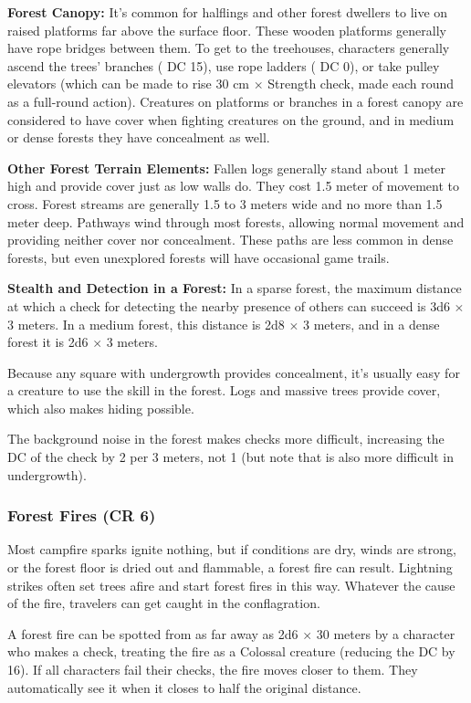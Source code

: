 \textbf{Forest Canopy:} It's common for halflings and other forest dwellers to live on raised platforms far above the surface floor. These wooden platforms generally have rope bridges between them. To get to the treehouses, characters generally ascend the trees' branches ( DC 15), use rope ladders ( DC 0), or take pulley elevators (which can be made to rise 30 cm $\times$ Strength check, made each round as a full-round action). Creatures on platforms or branches in a forest canopy are considered to have cover when fighting creatures on the ground, and in medium or dense forests they have concealment as well.

\textbf{Other Forest Terrain Elements:} Fallen logs generally stand about 1 meter high and provide cover just as low walls do. They cost 1.5 meter of movement to cross. Forest streams are generally 1.5 to 3 meters wide and no more than 1.5 meter deep. Pathways wind through most forests, allowing normal movement and providing neither cover nor concealment. These paths are less common in dense forests, but even unexplored forests will have occasional game trails.

\textbf{Stealth and Detection in a Forest:} In a sparse forest, the maximum distance at which a  check for detecting the nearby presence of others can succeed is 3d6 $\times$ 3 meters. In a medium forest, this distance is 2d8 $\times$ 3 meters, and in a dense forest it is 2d6 $\times$ 3 meters.

Because any square with undergrowth provides concealment, it's usually easy for a creature to use the  skill in the forest. Logs and massive trees provide cover, which also makes hiding possible.

The background noise in the forest makes  checks more difficult, increasing the DC of the check by 2 per 3 meters, not 1 (but note that  is also more difficult in undergrowth).

\subsubsection{Forest Fires (CR 6)}
Most campfire sparks ignite nothing, but if conditions are dry, winds are strong, or the forest floor is dried out and flammable, a forest fire can result. Lightning strikes often set trees afire and start forest fires in this way. Whatever the cause of the fire, travelers can get caught in the conflagration.

A forest fire can be spotted from as far away as 2d6 $\times$ 30 meters by a character who makes a  check, treating the fire as a Colossal creature (reducing the DC by 16). If all characters fail their  checks, the fire moves closer to them. They automatically see it when it closes to half the original distance.


